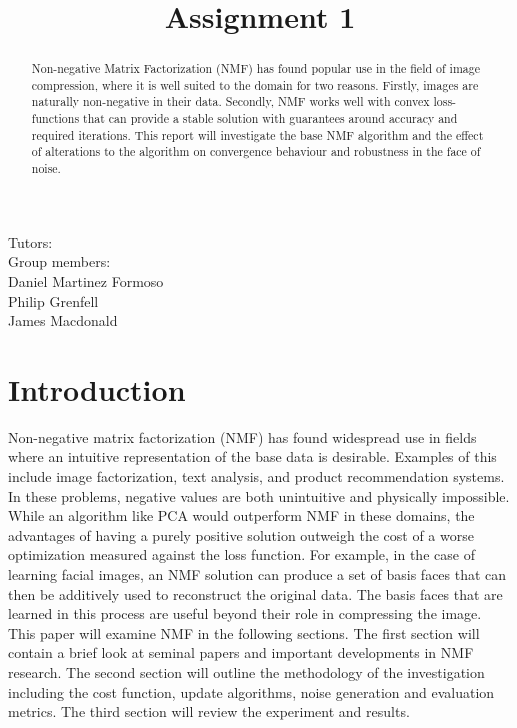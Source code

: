 \documentclass{article} %
\title{Assignment 1}
\begin{document}
\maketitle

Tutors: \\%
Group members:\\
Daniel Martinez Formoso\\
Philip Grenfell\\
James Macdonald\\

\begin{abstract}
Non-negative Matrix Factorization (NMF) has found popular use in the field of image compression, where it is well suited to the domain for two reasons. Firstly, images are naturally non-negative in their data. Secondly, NMF works well with convex loss-functions that can provide a stable solution with guarantees around accuracy and required iterations. This report will investigate the base NMF algorithm and the effect of alterations to the algorithm on convergence behaviour and robustness in the face of noise.
\end{abstract}

\section{Introduction}

Non-negative matrix factorization (NMF) has found widespread use in fields where an intuitive representation of the base data is desirable. Examples of this include image factorization, text analysis, and product recommendation systems. In these problems, negative values are both unintuitive and physically impossible. While an algorithm like PCA would outperform NMF in these domains, the advantages of having a purely positive solution outweigh the cost of a worse optimization measured against the loss function. For example, in the case of learning facial images, an NMF solution can produce a set of basis faces that can then be additively used to reconstruct the original data. The basis faces that are learned in this process are useful beyond their role in compressing the image.\\

This paper will examine NMF in the following sections. The first section will contain a brief look at seminal papers and important developments in NMF research. The second section will outline the methodology of the investigation including the cost function, update algorithms, noise generation and evaluation metrics. The third section will review the experiment and results.\\
\end{document}
